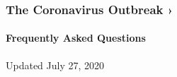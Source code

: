 \href{https://www.nytimes.com/news-event/coronavirus?action=click\&pgtype=Article\&state=default\&region=MAIN_CONTENT_3\&context=storylines_faq}{}

\hypertarget{the-coronavirus-outbreak-}{%
\subsubsection{The Coronavirus Outbreak
›}\label{the-coronavirus-outbreak-}}

\hypertarget{frequently-asked-questions}{%
\paragraph{Frequently Asked
Questions}\label{frequently-asked-questions}}

Updated July 27, 2020

